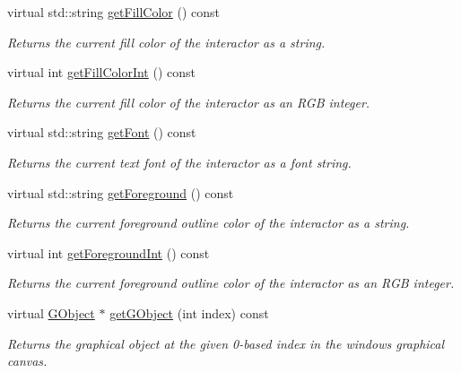 \begin{DoxyCompactItemize}
virtual std\+::string \mbox{\hyperlink{classsgl_1_1GDrawingSurface_a76f6964a11fde7c78e9751be184e1a3c}{get\+Fill\+Color}} () const
\begin{DoxyCompactList}\small\item\em Returns the current fill color of the interactor as a string. \end{DoxyCompactList}\item 
virtual int \mbox{\hyperlink{classsgl_1_1GDrawingSurface_a88f4508d9271c4b5f5b5d6b780f223d0}{get\+Fill\+Color\+Int}} () const
\begin{DoxyCompactList}\small\item\em Returns the current fill color of the interactor as an R\+GB integer. \end{DoxyCompactList}\item 
virtual std\+::string \mbox{\hyperlink{classsgl_1_1GDrawingSurface_a894a5502900794eeb27d084c21f1d77d}{get\+Font}} () const
\begin{DoxyCompactList}\small\item\em Returns the current text font of the interactor as a font string. \end{DoxyCompactList}\item 
virtual std\+::string \mbox{\hyperlink{classsgl_1_1GDrawingSurface_a4fa2d8b0192a3a5b4af4bbfe71194d03}{get\+Foreground}} () const
\begin{DoxyCompactList}\small\item\em Returns the current foreground outline color of the interactor as a string. \end{DoxyCompactList}\item 
virtual int \mbox{\hyperlink{classsgl_1_1GDrawingSurface_ac3b12ab385a6ef9ae90fc879860ba726}{get\+Foreground\+Int}} () const
\begin{DoxyCompactList}\small\item\em Returns the current foreground outline color of the interactor as an R\+GB integer. \end{DoxyCompactList}\item 
virtual \mbox{\hyperlink{classsgl_1_1GObject}{G\+Object}} $\ast$ \mbox{\hyperlink{classsgl_1_1GWindow_adf27adaeeb8b551424b2096a20285fde}{get\+G\+Object}} (int index) const
\begin{DoxyCompactList}\small\item\em Returns the graphical object at the given 0-\/based index in the window\textquotesingle{}s graphical canvas. \end{DoxyCompactList}\item 

\end{DoxyCompactItemize}
